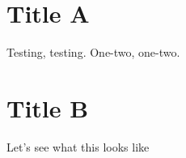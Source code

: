 \documentclass[12pt,]{report}
\begin{document}
\FloatBarrier
\newpage
{}

\appendix
\chapter{Title A}

Testing, testing. One-two, one-two.

\chapter{Title B}

Let's see what this looks like

\FloatBarrier
\clearpage



\end{document}

